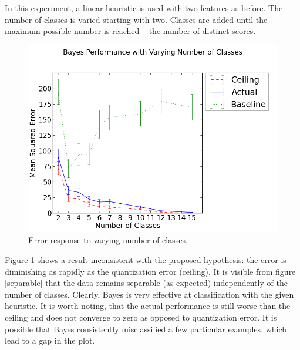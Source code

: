 \documentclass[12pt,notitlepage,twoside]{scrreprt}
\begin{document}
In this experiment, a linear heuristic is used with two features as before. The number of
classes is varied starting with two. Classes are added until the maximum possible
number is reached -- the number of distinct scores. 

\begin{figure}[h!]
  \includegraphics[width=\linewidth]{figs/quants.png}
  \caption{Error response to varying number of classes.\label{quants}}
\end{figure}
Figure \ref{quants} shows a result inconsistent with the proposed hypothesis: the error is
diminishing as rapidly as the quantization error (ceiling). It is visible from figure
\ref{separable} that the data remains separable (as expected) independently of the number
of classes. Clearly, Bayes is very effective at classification with the given heuristic.
It is worth noting, that the actual performance is still worse than the ceiling and does
not converge to zero as opposed to quantization error. It is possible that Bayes
consistently misclassified a few particular examples, which lead to a gap in the plot.
\end{document}
